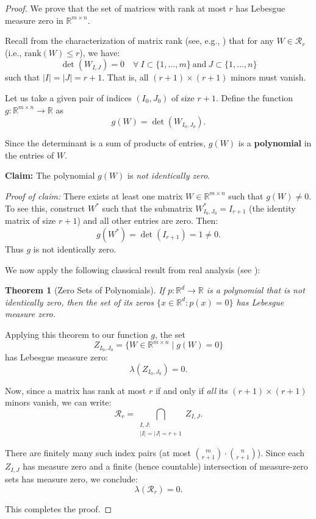 \documentclass{article}
\theoremstyle{plain}
\newtheorem{theorem}{Theorem}[section]
\theoremstyle{definition}
\theoremstyle{remark}
\begin{document}
\begin{proof}
We prove that the set of matrices with rank at most $r$ has Lebesgue measure zero in $\mathbb{R}^{m \times n}$.

Recall from the characterization of matrix rank (see, e.g., \cite{ford2014numerical}) that for any $W \in \mathcal{R}_r$ (i.e., $\mathrm{rank}(W) \leq r$), we have:
\[
\det(W_{I, J}) = 0 \quad \forall \ I \subset \{1, \ldots, m\} \ \text{and} \ 
J \subset \{1, \ldots, n\}
\]
such that $|I| = |J| = r+1$. That is, all $(r+1) \times (r+1)$ minors must vanish.

Let us take a given pair of indices $(I_0, J_0)$ of size $r+1$. Define the function $g : \mathbb{R}^{m \times n} \rightarrow \mathbb{R}$ as
\[
g(W) = \det(W_{I_0, J_0}).
\]

Since the determinant is a sum of products of entries, $g(W)$ is a \textbf{polynomial} in the entries of $W$.

\textbf{Claim:} The polynomial $g(W)$ is \emph{not identically zero}.

\textit{Proof of claim:} There exists at least one matrix $W \in \mathbb{R}^{m \times n}$ such that $g(W) \neq 0$. To see this, construct $W^*$ such that the submatrix $W^*_{I_0, J_0} = I_{r+1}$ (the identity matrix of size $r+1$) and all other entries are zero. Then:
\[
g(W^*) = \det(I_{r+1}) = 1 \neq 0.
\]
Thus $g$ is not identically zero. 

We now apply the following classical result from real analysis (see \cite{folland1999real}):

\begin{theorem}[Zero Sets of Polynomials]
If $p : \mathbb{R}^d \rightarrow \mathbb{R}$ is a polynomial that is not identically zero, then the set of its zeros $\{x \in \mathbb{R}^d : p(x) = 0\}$ has Lebesgue measure zero.
\end{theorem}

Applying this theorem to our function $g$, the set
\[
Z_{I_0, J_0} = \{W \in \mathbb{R}^{m \times n} \mid g(W) = 0\}
\]
has Lebesgue measure zero:
\[
\lambda(Z_{I_0, J_0}) = 0.
\]

Now, since a matrix has rank at most $r$ if and only if \emph{all} its $(r+1) \times (r+1)$ minors vanish, we can write:
\[
\mathcal{R}_r = \bigcap_{\substack{I, J : \\ |I|=|J|=r+1}} Z_{I,J}.
\]

There are finitely many such index pairs (at most $\binom{m}{r+1} \cdot \binom{n}{r+1}$). Since each $Z_{I,J}$ has measure zero and a finite (hence countable) intersection of measure-zero sets has measure zero, we conclude:
\[
\lambda(\mathcal{R}_r) = 0.
\]

This completes the proof.
\end{proof}
\end{document}
